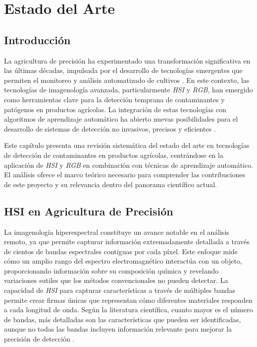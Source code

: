 \chapter{Estado del Arte}

\section{Introducción}

La agricultura de precisión ha experimentado una transformación significativa en las últimas décadas, impulsada por el desarrollo de tecnologías emergentes que permiten el monitoreo y análisis automatizado de cultivos \cite{CISTERNAS2020105626, KHAN2022101678}. En este contexto, las tecnologías de imagenología avanzada, particularmente \emph{HSI} y \emph{RGB}, han emergido como herramientas clave para la detección temprana de contaminantes y patógenos en productos agrícolas. La integración de estas tecnologías con algoritmos de aprendizaje automático ha abierto nuevas posibilidades para el desarrollo de sistemas de detección no invasivos, precisos y eficientes \cite{KHAN2022101678, jimaging5050052, agriengineering6040225}.

\vspace{5mm}

Este capítulo presenta una revisión sistemática del estado del arte en tecnologías de detección de contaminantes en productos agrícolas, centrándose en la aplicación de \emph{HSI} y \emph{RGB} en combinación con técnicas de aprendizaje automático. El análisis ofrece el marco teórico necesario para comprender las contribuciones de este proyecto y su relevancia dentro del panorama científico actual.

\section{HSI en Agricultura de Precisión}

La imagenología hiperespectral constituye un avance notable en el análisis remoto, ya que permite capturar información extremadamente detallada a través de cientos de bandas espectrales contiguas por cada píxel. Este enfoque mide cómo un amplio rango del espectro electromagnético interactúa con un objeto, proporcionando información sobre su composición química y revelando variaciones sutiles que los métodos convencionales no pueden detectar. La capacidad de \emph{HSI} para capturar características a través de múltiples bandas permite crear firmas únicas que representan cómo diferentes materiales responden a cada longitud de onda. Según la literatura científica, cuanto mayor es el número de bandas, más detalladas son las características que pueden ser identificadas, aunque no todas las bandas incluyen información relevante para mejorar la precisión de detección \cite{HONG201935}.

